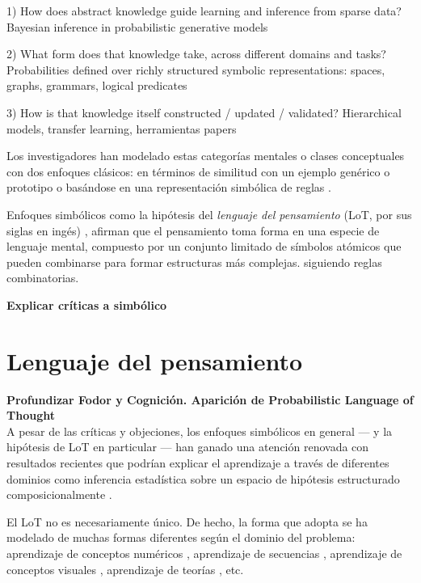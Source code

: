 1) How does abstract knowledge guide learning and inference from sparse data?
Bayesian inference in probabilistic generative models

2) What form does that knowledge take, across different domains and tasks?
Probabilities defined over richly structured symbolic representations: spaces, graphs, grammars, logical predicates

3) How is that knowledge itself constructed / updated / validated?
Hierarchical models, transfer learning, herramientas papers


Los investigadores han modelado estas categorías mentales o clases conceptuales con dos enfoques clásicos: en términos de similitud con un ejemplo genérico o prototipo \cite{rosch1999principles, nosofsky1986attention, rosch1976structural, rosch1975family} o basándose en una representación simbólica de reglas \cite{boole1854investigation, fodor1975language, gentner1983structure}.

Enfoques simbólicos como la hipótesis del \textit{lenguaje del pensamiento} (LoT, por sus siglas en ingés) \cite{fodor1975language}, afirman que el pensamiento toma forma en una especie de lenguaje mental, compuesto por un conjunto limitado de símbolos atómicos que pueden combinarse para formar estructuras más complejas. siguiendo reglas combinatorias.

\textbf{Explicar críticas a simbólico} \cite{blackburn1984spreading, loewer1991meaning, knowles1998language, aydede1997language} \\


\section{Lenguaje del pensamiento}

\textbf{Profundizar Fodor y Cognición. Aparición de Probabilistic Language of Thought}\\

A pesar de las críticas y objeciones, los enfoques simbólicos en general --- y la hipótesis de LoT en particular --- han ganado una atención renovada con resultados recientes que podrían explicar el aprendizaje a través de diferentes dominios como inferencia estadística sobre un espacio de hipótesis estructurado composicionalmente \cite{tenenbaum2011grow, piantadosi2016four}.

El LoT no es necesariamente único. De hecho, la forma que adopta se ha modelado de muchas formas diferentes según el dominio del problema: aprendizaje de conceptos numéricos \cite{piantadosi2012bootstrapping}, aprendizaje de secuencias \cite{marie2016, yildirim2015learning, romano2013language}, aprendizaje de conceptos visuales \cite{ellis2015unsupervised}, aprendizaje de teorías \cite{ullman2012theory}, etc.


